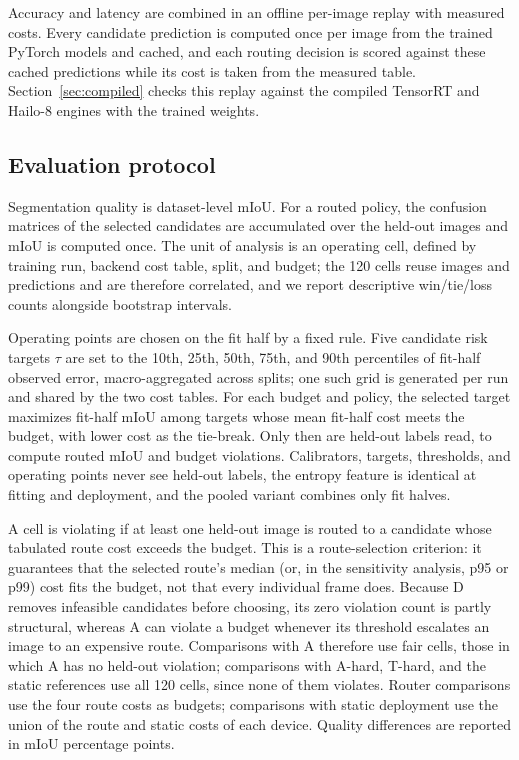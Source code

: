 \documentclass[a4paper,5p]{elsarticle}
\newcommand{\miou}{mIoU}
\begin{document}
Accuracy and latency are combined in an offline per-image replay with measured costs. Every candidate prediction is computed once per image from the trained PyTorch models and cached, and each routing decision is scored against these cached predictions while its cost is taken from the measured table. Section~\ref{sec:compiled} checks this replay against the compiled TensorRT and Hailo-8 engines with the trained weights.

\subsection{Evaluation protocol}
\label{sec:split}

Segmentation quality is dataset-level \miou{}. For a routed policy, the confusion matrices of the selected candidates are accumulated over the held-out images and \miou{} is computed once. The unit of analysis is an operating cell, defined by training run, backend cost table, split, and budget; the 120 cells reuse images and predictions and are therefore correlated, and we report descriptive win/tie/loss counts alongside bootstrap intervals.

Operating points are chosen on the fit half by a fixed rule. Five candidate risk targets $\tau$ are set to the 10th, 25th, 50th, 75th, and 90th percentiles of fit-half observed error, macro-aggregated across splits; one such grid is generated per run and shared by the two cost tables. For each budget and policy, the selected target maximizes fit-half \miou{} among targets whose mean fit-half cost meets the budget, with lower cost as the tie-break. Only then are held-out labels read, to compute routed \miou{} and budget violations. Calibrators, targets, thresholds, and operating points never see held-out labels, the entropy feature is identical at fitting and deployment, and the pooled variant combines only fit halves.

A cell is violating if at least one held-out image is routed to a candidate whose tabulated route cost exceeds the budget. This is a route-selection criterion: it guarantees that the selected route's median (or, in the sensitivity analysis, p95 or p99) cost fits the budget, not that every individual frame does. Because D removes infeasible candidates before choosing, its zero violation count is partly structural, whereas A can violate a budget whenever its threshold escalates an image to an expensive route. Comparisons with A therefore use fair cells, those in which A has no held-out violation; comparisons with A-hard, T-hard, and the static references use all 120 cells, since none of them violates. Router comparisons use the four route costs as budgets; comparisons with static deployment use the union of the route and static costs of each device. Quality differences are reported in \miou{} percentage points.
\end{document}
